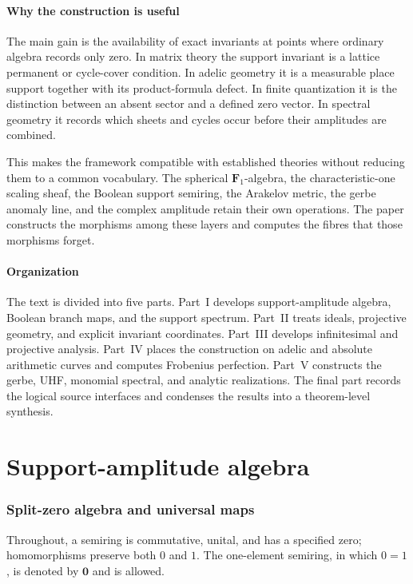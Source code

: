 \documentclass[11pt]{amsart}
\numberwithin{equation}{section}
\theoremstyle{definition}
\newcommand{\Fone}{\mathbf F_1}
\newcommand{\zero}{\mathbf 0}
\begin{document}
\subsection*{Why the construction is useful}

The main gain is the availability of exact invariants at points where
ordinary algebra records only zero.  In matrix theory the support invariant
is a lattice permanent or cycle-cover condition.  In adelic geometry it is
a measurable place support together with its product-formula defect.  In
finite quantization it is the distinction between an absent sector and a
defined zero vector.  In spectral geometry it records which sheets and
cycles occur before their amplitudes are combined.

This makes the framework compatible with established theories without
reducing them to a common vocabulary.  The spherical $\Fone$-algebra, the
characteristic-one scaling sheaf, the Boolean support semiring, the
Arakelov metric, the gerbe anomaly line, and the complex amplitude retain
their own operations.  The paper constructs the morphisms among these
layers and computes the fibres that those morphisms forget.

\subsection*{Organization}

The text is divided into five parts.  Part~I develops support-amplitude
algebra, Boolean branch maps, and the support spectrum.  Part~II treats ideals, projective geometry, and
explicit invariant coordinates.  Part~III develops infinitesimal and
projective analysis.  Part~IV places the construction on adelic and
absolute arithmetic curves and computes Frobenius perfection.  Part~V
constructs the gerbe, UHF, monomial spectral, and analytic realizations.
The final part records the logical source interfaces and condenses the
results into a theorem-level synthesis.

\part{Support-amplitude algebra}

\section{Split-zero algebra and universal maps}

Throughout, a semiring is commutative, unital, and has a specified zero; homomorphisms preserve both $0$ and $1$.  The one-element semiring, in which $0=1$, is denoted by $\zero$ and is allowed.
\end{document}
